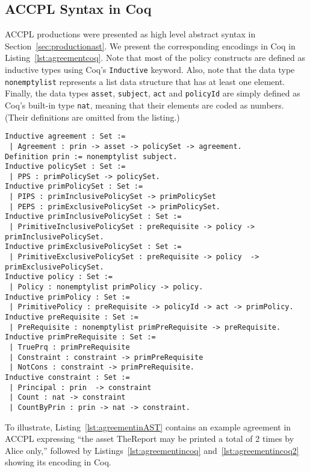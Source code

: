\documentclass[runningheads,a4paper]{llncs}
\newcommand{\syn}{\texttt}
\begin{document}
\subsection{ACCPL Syntax in Coq}\label{sec:agreementConstructor}

\ac{ACCPL} productions were presented as high level abstract syntax in
Section~\ref{sec:productionast}. We present the corresponding
encodings in Coq in Listing~\ref{lst:agreementcoq}. Note that most of
the policy constructs are defined as inductive types using Coq's
\syn{Inductive} keyword. Also, note that the data type
\syn{nonemptylist} represents a list data structure that has at least
one element.  Finally, the data types \syn{asset}, \syn{subject},
\syn{act} and \syn{policyId} are simply defined as Coq's built-in type
\syn{nat}, meaning that their elements are coded as numbers. (Their
definitions are omitted from the listing.)

\lstset{language=Coq, captionpos=b}
\begin{lstlisting}[frame=single, caption={ACCPL: Coq Version of Agreement},label={lst:agreementcoq}]
Inductive agreement : Set :=
 | Agreement : prin -> asset -> policySet -> agreement.
Definition prin := nonemptylist subject.
Inductive policySet : Set :=
 | PPS : primPolicySet -> policySet.
Inductive primPolicySet : Set :=
 | PIPS : primInclusivePolicySet -> primPolicySet
 | PEPS : primExclusivePolicySet -> primPolicySet.
Inductive primInclusivePolicySet : Set :=
 | PrimitiveInclusivePolicySet : preRequisite -> policy -> primInclusivePolicySet.
Inductive primExclusivePolicySet : Set :=
 | PrimitiveExclusivePolicySet : preRequisite -> policy  -> primExclusivePolicySet.
Inductive policy : Set :=
 | Policy : nonemptylist primPolicy -> policy.
Inductive primPolicy : Set :=
 | PrimitivePolicy : preRequisite -> policyId -> act -> primPolicy.  
Inductive preRequisite : Set :=
 | PreRequisite : nonemptylist primPreRequisite -> preRequisite.
Inductive primPreRequisite : Set :=
 | TruePrq : primPreRequisite
 | Constraint : constraint -> primPreRequisite
 | NotCons : constraint -> primPreRequisite.
Inductive constraint : Set :=
 | Principal : prin  -> constraint 
 | Count : nat -> constraint 
 | CountByPrin : prin -> nat -> constraint.  
\end{lstlisting}

To illustrate, Listing~\ref{lst:agreementinAST} contains an example
agreement in ACCPL expressing ``the asset TheReport may be printed a
total of 2 times by Alice only,'' followed by
Listings~\ref{lst:agreementincoq} and~\ref{lst:agreementincoq2}
showing its encoding in Coq.
\end{document}
